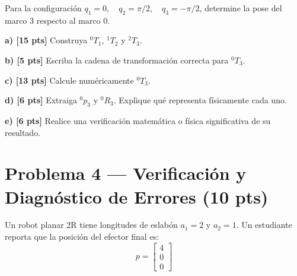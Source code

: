 \documentclass[11pt, a4paper]{article}
\begin{document}
\begin{center}
\end{center}

Para la configuración $q_1 = 0, \quad q_2 = \pi/2, \quad q_3 = -\pi/2$, determine la pose del marco 3 respecto al marco 0.

\textbf{a) [15 pts]} Construya ${}^{0}T_1$, ${}^{1}T_2$ y ${}^{2}T_3$.

\textbf{b) [5 pts]} Escriba la cadena de transformación correcta para ${}^{0}T_3$.

\textbf{c) [13 pts]} Calcule numéricamente ${}^{0}T_3$.

\textbf{d) [6 pts]} Extraiga ${}^{0}p_3$ y ${}^{0}R_3$. Explique qué representa físicamente cada uno.

\textbf{e) [6 pts]} Realice una verificación matemática o física significativa de su resultado.

\section*{Problema 4 — Verificación y Diagnóstico de Errores (10 pts)}
Un robot planar 2R tiene longitudes de eslabón $a_1 = 2$ y $a_2 = 1$. Un estudiante reporta que la posición del efector final es:
\begin{equation*}
    p = \begin{bmatrix} 4 \\ 0 \\ 0 \end{bmatrix}
\end{equation*}
\end{document}
